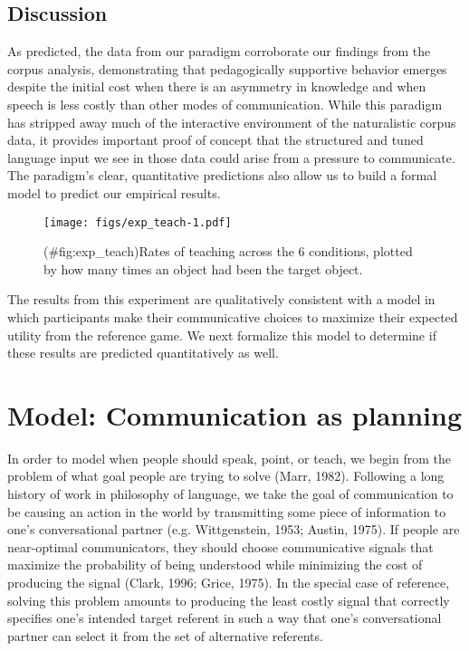 \documentclass[english,,man,floatsintext]{apa6}
\begin{document}
\hypertarget{discussion-1}{%
\subsection{Discussion}\label{discussion-1}}

As predicted, the data from our paradigm corroborate our findings from the corpus analysis, demonstrating that pedagogically supportive behavior emerges despite the initial cost when there is an asymmetry in knowledge and when speech is less costly than other modes of communication. While this paradigm has stripped away much of the interactive environment of the naturalistic corpus data, it provides important proof of concept that the structured and tuned language input we see in those data could arise from a pressure to communicate. The paradigm's clear, quantitative predictions also allow us to build a formal model to predict our empirical results.

\begin{figure}
\centering
\texttt{[image: figs/exp\_teach-1.pdf]}
\caption{(\#fig:exp\_teach)Rates of teaching across the 6 conditions, plotted by how many times an object had been the target object.}
\end{figure}

The results from this experiment are qualitatively consistent with a model in which participants make their communicative choices to maximize their expected utility from the reference game. We next formalize this model to determine if these results are predicted quantitatively as well.

\newcommand{\E}[1]{\mathbb{E}\left[ #1 \right]}

\hypertarget{model-communication-as-planning}{%
\section{Model: Communication as planning}\label{model-communication-as-planning}}

In order to model when people should speak, point, or teach, we begin from the problem of what goal people are trying to solve (Marr, 1982). Following a long history of work in philosophy of language, we take the goal of communication to be causing an action in the world by transmitting some piece of information to one's conversational partner (e.g. Wittgenstein, 1953; Austin, 1975). If people are near-optimal communicators, they should choose communicative signals that maximize the probability of being understood while minimizing the cost of producing the signal (Clark, 1996; Grice, 1975). In the special case of reference, solving this problem amounts to producing the least costly signal that correctly specifies one's intended target referent in such a way that one's conversational partner can select it from the set of alternative referents.
\end{document}
